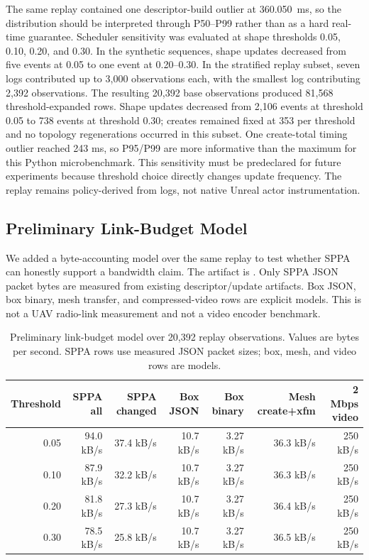 ﻿\documentclass[11pt,a4paper]{article}
\begin{document}
The same replay contained one descriptor-build outlier at 360.050~ms, so the
distribution should be interpreted through P50--P99 rather than as a hard
real-time guarantee. Scheduler sensitivity was evaluated at shape thresholds
0.05, 0.10, 0.20, and
0.30. In the synthetic sequences, shape updates decreased from five events at
0.05 to one event at 0.20--0.30. In the stratified replay subset, seven logs
contributed up to 3,000 observations each, with the smallest log contributing
2,392 observations. The resulting 20,392 base observations produced 81,568
threshold-expanded rows. Shape updates decreased from 2,106 events at threshold
0.05 to 738 events at threshold 0.30; creates remained fixed at 353 per
threshold and no topology regenerations occurred in this subset. One
create-total timing outlier reached 243 ms, so P95/P99 are more informative
than the maximum for this Python microbenchmark. This sensitivity must be
predeclared for future experiments because threshold choice directly changes
update frequency. The replay remains policy-derived from logs, not native
Unreal actor instrumentation.

\subsection{Preliminary Link-Budget Model}

We added a byte-accounting model over the same replay to test whether SPPA can
honestly support a bandwidth claim. The artifact is
. Only SPPA JSON
packet bytes are measured from existing descriptor/update artifacts. Box JSON,
box binary, mesh transfer, and compressed-video rows are explicit models. This
is not a UAV radio-link measurement and not a video encoder benchmark.

\begin{table}[h]
\centering
\scriptsize
\setlength{\tabcolsep}{4pt}
\caption{Preliminary link-budget model over 20,392 replay observations. Values
are bytes per second. SPPA rows use measured JSON packet sizes; box, mesh, and
video rows are models.}
\label{tab:sppa-bandwidth-model}
\begin{tabular}{@{}rrrrrrr@{}}
\toprule
Threshold & SPPA all & SPPA changed & Box JSON & Box binary & Mesh create+xfm & 2 Mbps video \\
\midrule
0.05 & 94.0 kB/s & 37.4 kB/s & 10.7 kB/s & 3.27 kB/s & 36.3 kB/s & 250 kB/s \\
0.10 & 87.9 kB/s & 32.2 kB/s & 10.7 kB/s & 3.27 kB/s & 36.3 kB/s & 250 kB/s \\
0.20 & 81.8 kB/s & 27.3 kB/s & 10.7 kB/s & 3.27 kB/s & 36.4 kB/s & 250 kB/s \\
0.30 & 78.5 kB/s & 25.8 kB/s & 10.7 kB/s & 3.27 kB/s & 36.5 kB/s & 250 kB/s \\
\bottomrule
\end{tabular}
\end{table}
\end{document}
